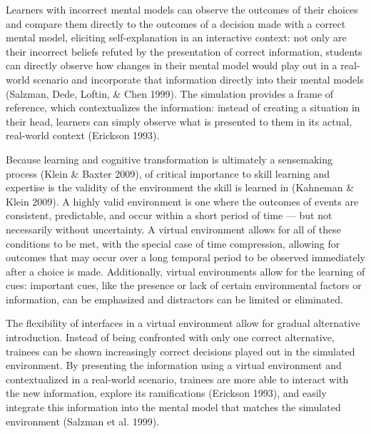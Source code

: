 \documentclass{book}
\begin{document}
Learners with incorrect mental models can observe the outcomes of their choices and compare them directly to the outcomes of a decision made with a correct mental model, eliciting self-explanation in an interactive context: not only are their incorrect beliefs refuted by the presentation of correct information, students can directly observe how changes in their mental model would play out in a real-world scenario and incorporate that information directly into their mental models (Salzman, Dede, Loftin, & Chen 1999). The simulation provides a frame of reference, which contextualizes the information: instead of creating a situation in their head, learners can simply observe what is presented to them in its actual, real-world context (Erickson 1993).

Because learning and cognitive transformation is ultimately a sensemaking process (Klein & Baxter 2009), of critical importance to skill learning and expertise is the validity of the environment the skill is learned in (Kahneman & Klein 2009). A highly valid environment is one where the outcomes of events are consistent, predictable, and occur within a short period of time — but not necessarily without uncertainty. A virtual environment allows for all of these conditions to be met, with the special case of time compression, allowing for outcomes that may occur over a long temporal period to be observed immediately after a choice is made. Additionally, virtual environments allow for the learning of cues: important cues, like the presence or lack of certain environmental factors or information, can be emphasized and distractors can be limited or eliminated.

The flexibility of interfaces in a virtual environment allow for gradual alternative introduction. Instead of being confronted with only one correct alternative, trainees can be shown increasingly correct decisions played out in the simulated environment. By presenting the information using a virtual environment and contextualized in a real-world scenario, trainees are more able to interact with the new information, explore its ramifications (Erickson 1993), and easily integrate this information into the mental model that matches the simulated environment (Salzman et al. 1999).
\end{document}
